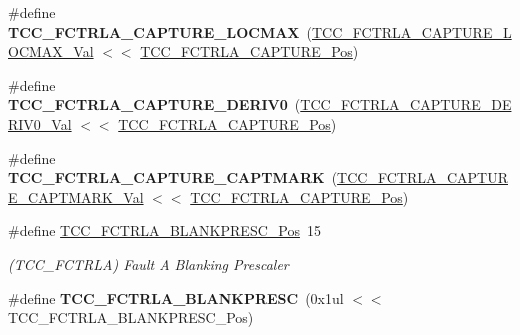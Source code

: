 \begin{DoxyCompactItemize}
\item 
\hypertarget{group___s_a_m_l21___t_c_c_ga6636e38daa52c9d2cbf670000bd9b968}{}\#define {\bfseries T\+C\+C\+\_\+\+F\+C\+T\+R\+L\+A\+\_\+\+C\+A\+P\+T\+U\+R\+E\+\_\+\+L\+O\+C\+M\+A\+X}~(\hyperlink{group___s_a_m_l21___t_c_c_ga4a99b753c5ef9795a144b200472484da}{T\+C\+C\+\_\+\+F\+C\+T\+R\+L\+A\+\_\+\+C\+A\+P\+T\+U\+R\+E\+\_\+\+L\+O\+C\+M\+A\+X\+\_\+\+Val} $<$$<$ \hyperlink{group___s_a_m_l21___t_c_c_ga130a647ff472e004168fd7ec22f13b9d}{T\+C\+C\+\_\+\+F\+C\+T\+R\+L\+A\+\_\+\+C\+A\+P\+T\+U\+R\+E\+\_\+\+Pos})\label{group___s_a_m_l21___t_c_c_ga6636e38daa52c9d2cbf670000bd9b968}

\item 
\hypertarget{group___s_a_m_l21___t_c_c_gab74d3247da05921052320efa8765a359}{}\#define {\bfseries T\+C\+C\+\_\+\+F\+C\+T\+R\+L\+A\+\_\+\+C\+A\+P\+T\+U\+R\+E\+\_\+\+D\+E\+R\+I\+V0}~(\hyperlink{group___s_a_m_l21___t_c_c_ga23068d24943345d43d99e77076d3c97b}{T\+C\+C\+\_\+\+F\+C\+T\+R\+L\+A\+\_\+\+C\+A\+P\+T\+U\+R\+E\+\_\+\+D\+E\+R\+I\+V0\+\_\+\+Val} $<$$<$ \hyperlink{group___s_a_m_l21___t_c_c_ga130a647ff472e004168fd7ec22f13b9d}{T\+C\+C\+\_\+\+F\+C\+T\+R\+L\+A\+\_\+\+C\+A\+P\+T\+U\+R\+E\+\_\+\+Pos})\label{group___s_a_m_l21___t_c_c_gab74d3247da05921052320efa8765a359}

\item 
\hypertarget{group___s_a_m_l21___t_c_c_ga8b0a7227b811ae4c25ecedf793a143ad}{}\#define {\bfseries T\+C\+C\+\_\+\+F\+C\+T\+R\+L\+A\+\_\+\+C\+A\+P\+T\+U\+R\+E\+\_\+\+C\+A\+P\+T\+M\+A\+R\+K}~(\hyperlink{group___s_a_m_l21___t_c_c_ga2608a689150357111faa054ec7b34bf1}{T\+C\+C\+\_\+\+F\+C\+T\+R\+L\+A\+\_\+\+C\+A\+P\+T\+U\+R\+E\+\_\+\+C\+A\+P\+T\+M\+A\+R\+K\+\_\+\+Val} $<$$<$ \hyperlink{group___s_a_m_l21___t_c_c_ga130a647ff472e004168fd7ec22f13b9d}{T\+C\+C\+\_\+\+F\+C\+T\+R\+L\+A\+\_\+\+C\+A\+P\+T\+U\+R\+E\+\_\+\+Pos})\label{group___s_a_m_l21___t_c_c_ga8b0a7227b811ae4c25ecedf793a143ad}

\item 
\hypertarget{group___s_a_m_l21___t_c_c_gaab8a0d59de42a938deb60350f83ff766}{}\#define \hyperlink{group___s_a_m_l21___t_c_c_gaab8a0d59de42a938deb60350f83ff766}{T\+C\+C\+\_\+\+F\+C\+T\+R\+L\+A\+\_\+\+B\+L\+A\+N\+K\+P\+R\+E\+S\+C\+\_\+\+Pos}~15\label{group___s_a_m_l21___t_c_c_gaab8a0d59de42a938deb60350f83ff766}

\begin{DoxyCompactList}\small\item\em (T\+C\+C\+\_\+\+F\+C\+T\+R\+L\+A) Fault A Blanking Prescaler \end{DoxyCompactList}\item 
\hypertarget{group___s_a_m_l21___t_c_c_ga31a3ea6552880a39cdac3e2c515341a4}{}\#define {\bfseries T\+C\+C\+\_\+\+F\+C\+T\+R\+L\+A\+\_\+\+B\+L\+A\+N\+K\+P\+R\+E\+S\+C}~(0x1ul $<$$<$ T\+C\+C\+\_\+\+F\+C\+T\+R\+L\+A\+\_\+\+B\+L\+A\+N\+K\+P\+R\+E\+S\+C\+\_\+\+Pos)\label{group___s_a_m_l21___t_c_c_ga31a3ea6552880a39cdac3e2c515341a4}


\end{DoxyCompactItemize}
